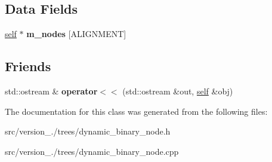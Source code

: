 \subsection*{Data Fields}
\begin{DoxyCompactItemize}
\item 
\mbox{\label{classez_1_1trees_1_1DynamicBinaryNode_abe1ece54d3b2fcafcde7b153ca367506}} 
\hyperlink{classez_1_1trees_1_1DynamicBinaryNode}{self} $\ast$ {\bfseries m\+\_\+nodes} \mbox{[}A\+L\+I\+G\+N\+M\+E\+NT\mbox{]}
\end{DoxyCompactItemize}
\subsection*{Friends}
\begin{DoxyCompactItemize}
\item 
\mbox{\label{classez_1_1trees_1_1DynamicBinaryNode_aa1d826e7fbedbc2b2358e08bc03fc894}} 
std\+::ostream \& {\bfseries operator$<$$<$} (std\+::ostream \&out, \hyperlink{classez_1_1trees_1_1DynamicBinaryNode}{self} \&obj)
\end{DoxyCompactItemize}


The documentation for this class was generated from the following files\+:\begin{DoxyCompactItemize}
\item 
src/version\+\_./trees/dynamic\+\_\+binary\+\_\+node.\+h\item 
src/version\+\_./trees/dynamic\+\_\+binary\+\_\+node.\+cpp\end{DoxyCompactItemize}
